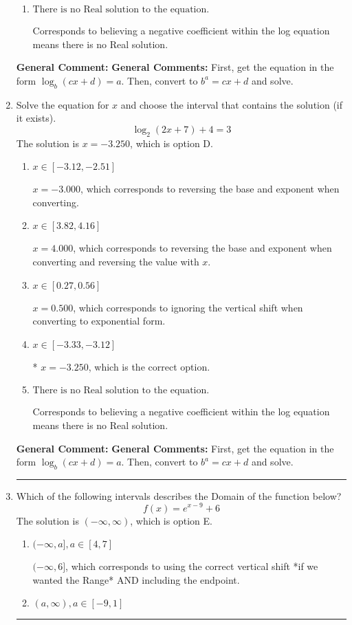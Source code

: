 \documentclass{extbook}[14pt]
\newcommand{\litem}[1]{\item #1

\rule{\textwidth}{0.4pt}}
\begin{document}
\begin{enumerate}
{\begin{enumerate}[label=\Alph*.]
$x = 0.667$, which corresponds to ignoring the vertical shift when converting to exponential form.
\item \( \text{There is no Real solution to the equation.} \)

Corresponds to believing a negative coefficient within the log equation means there is no Real solution.
\end{enumerate}

\textbf{General Comment:} \textbf{General Comments:} First, get the equation in the form $\log_b{(cx+d)} = a$. Then, convert to $b^a = cx+d$ and solve.
}
\litem{
Solve the equation for $x$ and choose the interval that contains the solution (if it exists).
\[ \log_{2}{(2x+7)}+4 = 3 \]The solution is \( x = -3.250 \), which is option D.\begin{enumerate}[label=\Alph*.]
\item \( x \in [-3.12, -2.51] \)

$x = -3.000$, which corresponds to reversing the base and exponent when converting.
\item \( x \in [3.82, 4.16] \)

$x = 4.000$, which corresponds to reversing the base and exponent when converting and reversing the value with $x$.
\item \( x \in [0.27, 0.56] \)

$x = 0.500$, which corresponds to ignoring the vertical shift when converting to exponential form.
\item \( x \in [-3.33, -3.12] \)

* $x = -3.250$, which is the correct option.
\item \( \text{There is no Real solution to the equation.} \)

Corresponds to believing a negative coefficient within the log equation means there is no Real solution.
\end{enumerate}

\textbf{General Comment:} \textbf{General Comments:} First, get the equation in the form $\log_b{(cx+d)} = a$. Then, convert to $b^a = cx+d$ and solve.
}
\litem{
Which of the following intervals describes the Domain of the function below?
\[ f(x) = e^{x-9}+6 \]The solution is \( (-\infty, \infty) \), which is option E.\begin{enumerate}[label=\Alph*.]
\item \( (-\infty, a], a \in [4, 7] \)

$(-\infty, 6]$, which corresponds to using the correct vertical shift *if we wanted the Range* AND including the endpoint.
\item \( (a, \infty), a \in [-9, 1] \)


\end{enumerate}}
\end{enumerate}
\end{document}
